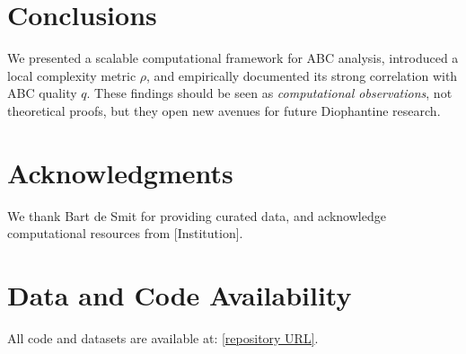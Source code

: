 \documentclass[11pt,a4paper]{article}
\begin{document}
\section{Conclusions}

We presented a scalable computational framework for ABC analysis, introduced a local complexity metric $\rho$, and empirically documented its strong correlation with ABC quality $q$. These findings should be seen as \emph{computational observations}, not theoretical proofs, but they open new avenues for future Diophantine research.

\section*{Acknowledgments}
We thank Bart de Smit for providing curated data, and acknowledge computational resources from [Institution].

\section*{Data and Code Availability}
All code and datasets are available at: \url{[repository URL]}.



\end{document}
